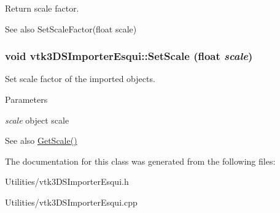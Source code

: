 Return scale factor. 

\begin{DoxySeeAlso}{See also}
SetScaleFactor(float scale) 
\end{DoxySeeAlso}
\hypertarget{classvtk3DSImporterEsqui_a79eed232c14247f4a9916c98ac5f5acc}{
\subsubsection[{SetScale}]{\setlength{\rightskip}{0pt plus 5cm}void vtk3DSImporterEsqui::SetScale (float {\em scale})}}
\label{classvtk3DSImporterEsqui_a79eed232c14247f4a9916c98ac5f5acc}


Set scale factor of the imported objects. 


\begin{DoxyParams}{Parameters}
\item[{\em scale}]object scale \end{DoxyParams}
\begin{DoxySeeAlso}{See also}
\hyperlink{classvtk3DSImporterEsqui_a3951ad4b8163e28825f7f9afdfcfa46c}{GetScale()} 
\end{DoxySeeAlso}


The documentation for this class was generated from the following files:\begin{DoxyCompactItemize}
\item 
Utilities/vtk3DSImporterEsqui.h\item 
Utilities/vtk3DSImporterEsqui.cpp\end{DoxyCompactItemize}
